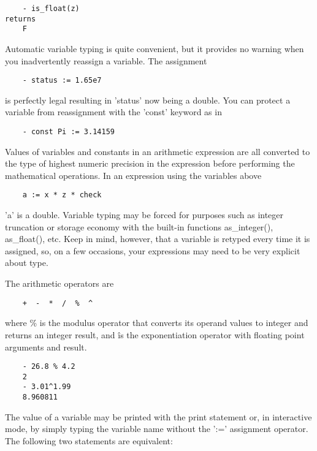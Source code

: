 \begin{verbatim}
	- is_float(z)
returns
	F
\end{verbatim}

    Automatic variable typing is quite convenient, but it provides no
warning when you inadvertently reassign a variable.  The assignment

\begin{verbatim}
	- status := 1.65e7
\end{verbatim}

is perfectly legal resulting in 'status' now being a double.  You can
protect a variable from reassignment with the 'const' keyword as in

\begin{verbatim}
	- const Pi := 3.14159
\end{verbatim}

    Values of variables and constants in an arithmetic expression are all
converted to the type of highest numeric precision in the expression before
performing the mathematical operations.  In an expression using the
variables above

\begin{verbatim}
	a := x * z * check
\end{verbatim}

'a' is a double.  Variable typing may be forced for purposes such as
integer truncation or storage economy with the built-in functions
as\_integer(), as\_float(), etc.  Keep in mind, however, that a variable is
retyped every time it is assigned, so, on a few occasions, your expressions
may need to be very explicit about type.

    The arithmetic operators are

\begin{verbatim}
	+  -  *  /  %  ^
\end{verbatim}

where \% is the modulus operator that converts its operand values to integer
and returns an integer result, and \^ is the exponentiation operator with
floating point arguments and result.

\begin{verbatim}
	- 26.8 % 4.2
	2
	- 3.01^1.99
	8.960811
\end{verbatim}

    The value of a variable may be printed with the print statement or, in
interactive mode, by simply typing the variable name without the ':='
assignment operator.  The following two statements are equivalent:

